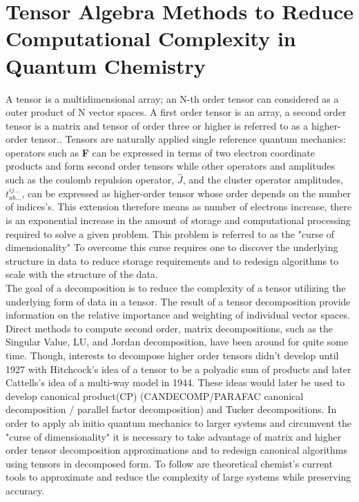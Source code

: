 \section{Tensor Algebra Methods to Reduce Computational Complexity in Quantum Chemistry}
	A tensor is a multidimensional array; an N-th order tensor can considered as a outer product of N vector spaces. A first order tensor is an array, a second order tensor is a matrix and tensor of order three or higher is referred to as a higher-order tensor.\cite{Kolda2008}. Tensors are naturally applied single reference quantum mechanics: operators such as \textbf{F} can be expressed in terms of two electron coordinate products and form second order tensors while other operators and amplitudes such as the coulomb repulsion operator, $\hat{J}$, and the cluster operator amplitudes, $t^{ij\dots}_{ab\dots}$, can be expressed as higher-order tensor whose order depends on the number of indices's.  This extension therefore means as number of electrons increase, there is an exponential increase in the amount of storage and computational processing required to solve a given problem.  This problem is referred to as the "curse of dimensionality" %
	 To overcome this curse requires one to discover the underlying structure in data to reduce storage requirements and to redesign algorithms to scale with the structure of the data.\\
	The goal of a decomposition is to reduce the complexity of a tensor utilizing the underlying form of data in a tensor.  The result of a tensor decomposition provide information on the relative importance and weighting of individual vector spaces.  Direct methods to compute second order, matrix decompositions, such as the Singular Value, LU, and Jordan decomposition, have been around for quite some time.  Though, interests to decompose higher order tensors didn't develop until 1927 with Hitchcock's idea of a tensor to be a polyadic sum of products\cite{Hitchcock 1927, Hitchcock 1928} and later Cattells's idea of a multi-way model in 1944\cite{Cattell 1944, Cattell 1952}. These ideas would later be used to develop canonical product(CP) (CANDECOMP/PARAFAC canonical decomposition / parallel factor decomposition) \cite{Carroll 1970, Harshman 1970} and Tucker decompositions\cite{Tucker 1966}.  In order to apply ab initio quantum mechanics to larger systems and circumvent the "curse of dimensionality" it is necessary to take advantage of matrix and higher order tensor decomposition approximations and to redesign canonical algorithms using tensors in decomposed form. To follow are theoretical chemist's current tools to approximate and reduce the complexity of large systems while preserving accuracy.

